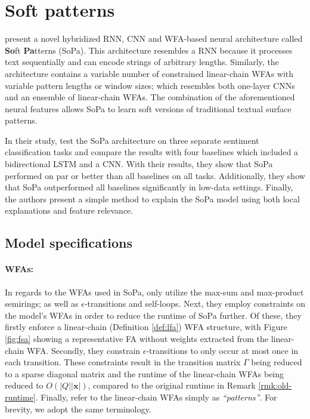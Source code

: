 \section{Soft patterns}

\label{section:soft-patterns}

\citet{schwartz2018sopa} present a novel hybridized RNN, CNN and WFA-based
neural architecture called \textbf{So}ft \textbf{Pa}tterns (SoPa). This
architecture resembles a RNN because it processes text sequentially and can
encode strings of arbitrary lengths. Similarly, the architecture contains a
variable number of constrained linear-chain WFAs with variable pattern lengths
or window sizes; which resembles both one-layer CNNs and an ensemble of
linear-chain WFAs. The combination of the aforementioned neural features allows
SoPa to learn soft versions of traditional textual surface patterns.

In their study, \citet{schwartz2018sopa} test the SoPa architecture on three
separate sentiment classification tasks and compare the results with four
baselines which included a bidirectional LSTM and a CNN. With their results,
they show that SoPa performed on par or better than all baselines on all tasks.
Additionally, they show that SoPa outperformed all baselines significantly in
low-data settings. Finally, the authors present a simple method to explain the
SoPa model using both local explanations and feature relevance.

\subsection{Model specifications}

\label{section:sopa-model-specs}

\paragraph{WFAs:} In regards to the WFAs used in SoPa, \citet{schwartz2018sopa}
only utilize the max-sum and max-product semirings; as well as
$\epsilon$-transitions and self-loops. Next, they employ constraints on the
model's WFAs in order to reduce the runtime of SoPa further. Of these, they
firstly enforce a linear-chain (Definition \ref{def:lfa}) WFA structure, with
Figure \ref{fig:fsa} showing a representative FA without weights extracted from
the linear-chain WFA. Secondly, they constrain $\epsilon$-transitions to only
occur at most once in each transition. These constraints result in the
transition matrix $\Gamma$ being reduced to a sparse diagonal matrix and the
runtime of the linear-chain WFAs being reduced to $O(|Q||\pmb{x}|)$, compared to
the original runtime in Remark \ref{rmk:old-runtime}. Finally, \citet[Page 3,
Section 3.1]{schwartz2018sopa} refer to the linear-chain WFAs simply as
\textit{``patterns''}. For brevity, we adopt the same terminology.


